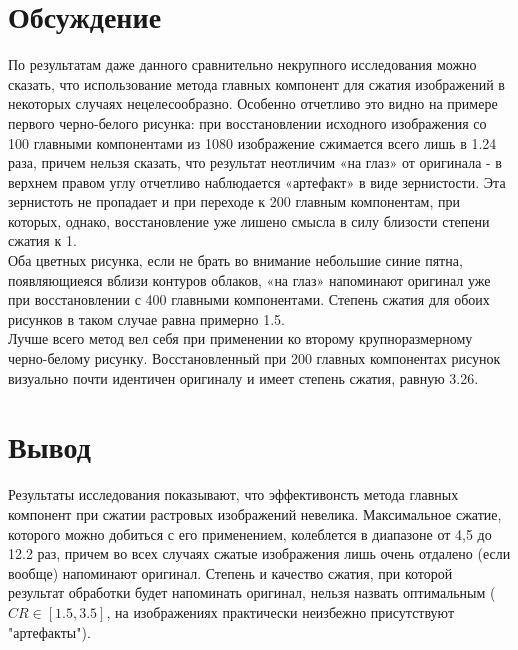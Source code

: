 \documentclass[a4paper]{article}
\begin{document}
\section{Обсуждение}
По результатам даже данного сравнительно некрупного исследования можно сказать, что использование метода главных компонент для сжатия изображений в некоторых случаях нецелесообразно. Особенно отчетливо это видно на примере первого черно-белого рисунка: при восстановлении исходного изображения со 100 главными компонентами из 1080 изображение сжимается всего лишь в 1.24 раза, причем нельзя сказать, что результат неотличим «на глаз» от оригинала - в верхнем правом углу отчетливо наблюдается «артефакт» в виде зернистости. Эта зернистоть не пропадает и при переходе к 200 главным компонентам, при которых, однако, восстановление уже лишено смысла в силу близости степени сжатия к 1.\\
Оба цветных рисунка, если не брать во внимание небольшие синие пятна, появляющиеяся вблизи контуров облаков, «на глаз» напоминают оригинал уже при восстановлении с 400 главными компонентами. Степень сжатия для обоих рисунков в таком случае равна примерно 1.5.\\
Лучше всего метод вел себя при применении ко второму крупноразмерному черно-белому рисунку. Восстановленный при 200 главных компонентах рисунок визуально почти идентичен оригиналу и имеет степень сжатия, равную 3.26.
\section{Вывод}
Результаты исследования показывают, что эффективонсть метода главных компонент при сжатии растровых изображений невелика. Максимальное сжатие, которого можно добиться с его применением, колеблется в диапазоне от 4,5 до 12.2 раз, причем во всех случаях сжатые изображения лишь очень отдалено (если вообще) напоминают оригинал. Степень и качество сжатия, при которой результат обработки будет напоминать оригинал, нельзя назвать оптимальным ($CR\in [1.5,3.5]$, на изображениях практически неизбежно присутствуют "артефакты").
\end{document}
